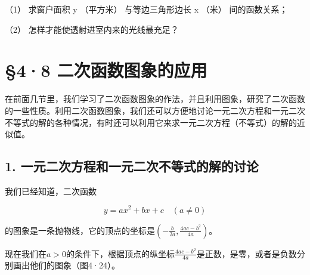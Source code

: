 （1） 求窗户面积 y （平方米） 与等边三角形边长 x （米） 间的函数关系；

（2） 怎样才能使透射进室内来的光线最充足？

\section{§4·8 二次函数图象的应用}

在前面几节里，我们学习了二次函数图象的作法，并且利用图象，研究了二次函数的一些性质。利用二次函数图象，我们还可以方便地讨论一元二次方程和一元二次不等式的解的各种情况，有时还可以利用它来求一元二次方程（不等式）的解的近似值。

\subsection{1. 一元二次方程和一元二次不等式的解的讨论}

我们已经知道，二次函数

\[
y = a x^{2} + b x + c \quad (a \neq 0)
\]

的图象是一条抛物线，它的顶点的坐标是\(\left(-\frac{b}{2a}, \frac{4ac - b^2}{4a}\right)\)。

现在我们在\(a > 0\)的条件下，根据顶点的纵坐标\(\frac{4ac - b^2}{4a}\)是正数，是零，或者是负数分别画出他们的图象（图4·24）。

